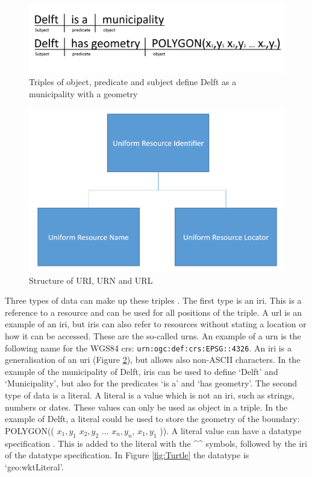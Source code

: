 \begin{figure}
	\centering
	\includegraphics[width=0.7\linewidth]{figs/Triples.png}
	\caption{Triples of object, predicate and subject define Delft as a municipality with a geometry}
	\label{fig:Triples}
\end{figure}

\begin{figure}
	\centering
	\includegraphics[width=0.6\linewidth]{figs/URI.png}
	\caption{Structure of URI, URN and URL}
	\label{fig:URI}
\end{figure}

Three types of data can make up these triples \citep{LD:W3C6}. The first type is an \ac{iri}. This is a reference to a resource and can be used for all positions of the triple. A \ac{url} is an example of an \ac{iri}, but \ac{iri}s can also refer to resources without stating a location or how it can be accessed. These are the so-called \acp{urn}. An example of a \ac{urn} is the following name for the WGS84 \ac{crs}: \texttt{urn:ogc:def:crs:EPSG::4326}. An \ac{iri} is a generalisation of an \ac{uri} (Figure \ref{fig:URI}), but allows also non-ASCII characters. In the example of the municipality of Delft, \ac{iri}s can be used to define `Delft' and `Municipality', but also for the predicates `is a' and `has geometry'. The second type of data is a literal. A literal is a value which is not an \ac{iri}, such as strings, numbers or dates. These values can only be used as object in a triple. In the example of Delft, a literal could be used to store the geometry of the boundary: POLYGON(( $x_{1},y_{1}$ $x_{2},y_{2}$ ... $x_{n},y_{n}$, $x_{1},y_{1}$ )). A literal value can have a datatype specification \citep{LD:W3C7}. This is added to the literal with the \^{}\^{} symbols, followed by the \ac{iri} of the datatype specification. In Figure \ref{fig:Turtle} the datatype is `geo:wktLiteral'.

